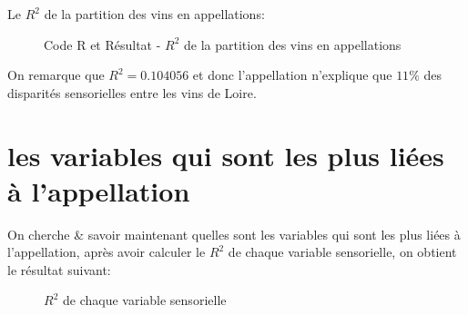 \newpage

Le $R^2$ de la partition des vins en appellations:

\begin{figure}[h]
\centering
{}
\caption{Code R et Résultat - $R^2$ de la partition des vins en appellations}
\end{figure}

On remarque que $R^2 = 0.104056$ et donc l'appellation n'explique que $11\%$ des disparités sensorielles entre les
vins de Loire.
\section{les variables qui sont les plus liées à l'appellation}
 On cherche & savoir maintenant quelles sont les variables qui sont les plus liées à l'appellation, après avoir calculer le $R^2$ de chaque variable sensorielle, on obtient le résultat suivant:
 
\begin{figure}[h]
\centering
{}
\caption{$R^2$ de chaque variable sensorielle}
\end{figure}

